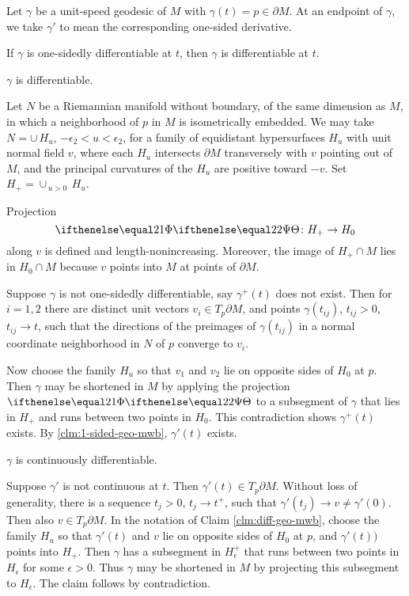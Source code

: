 Let  $\gamma$ be a unit-speed geodesic of $M$ with $\gamma(t)=p\in\partial M$.  
At an endpoint of $\gamma$, we take $\gamma'$ to mean the corresponding one-sided derivative.

\begin{clm}{}\label{clm:1-sided-geo-mwb}
If $\gamma$ is one-sidedly differentiable at $t$, then $\gamma$ is differentiable at $t$.
\end{clm}

\begin{clm}{}\label{clm:diff-geo-mwb}
$\gamma$ is differentiable.
\end{clm}
Let $N$ be a Riemannian manifold without boundary, of the same dimension as $M$, in which  a neighborhood of $p$ in $M$ is isometrically embedded. We may take  $N=\cup \,H_u$, $-\epsilon_2<u<\epsilon_2$, for a family of equidistant hypersurfaces $H_u$ with unit normal field $v$,  where each $H_u$ intersects $\partial M$ transversely with $v$ pointing out of $M$, and the 
principal curvatures of the $H_u$ are positive toward $-v$. 
Set $H_+=\cup_{\,u>0} \,H_u$.

Projection 
$$\map[2]\:H_+ \to H_0$$
 along $v$ is defined and length-nonincreasing.  Moreover, the image of $H_+\cap M$ lies in $H_0\cap M$ because $v$ points into $M$ at points of $\partial M$.

Suppose $\gamma$ is not one-sidedly differentiable, say $\gamma^+(t)$ does not exist.  Then for $i=1,2$ there are distinct unit vectors $v_i \in T_p\partial M$, and points $\gamma(t_{ij})$, $t_{ij}>0$, $t_{ij}\to t$, such that the directions of the preimages of $\gamma(t_{ij})$ in a normal coordinate neighborhood in $N$ of $p$  converge to $v_i$.

Now choose the family $H_u$ so that $v_1$ and $v_2$ lie on opposite sides of $H_0$ at $p$.  Then $\gamma$ may be shortened in $M$ by applying the projection $\map[2]$ to a subsegment of $\gamma$ that lies in $H_+$ and runs between two points in $H_0$.  This contradiction shows $\gamma^+(t)$ exists. By \ref{clm:1-sided-geo-mwb}, $\gamma'(t)$  exists.

\begin{clm}{}\label{clm:C^1-geo-mwb}
$\gamma$ is continuously differentiable. 
\end{clm}

 Suppose $\gamma'$ is not continuous at $t$. Then $\gamma'(t)\in T_p\partial M$. Without loss of generality, there is a sequence $t_j>0$, $t_j\to t^+$, such that  $\gamma'(t_j)\to v\ne \gamma'(0)$.  Then also $v\in T_p\partial M$. In the notation of Claim \ref{clm:diff-geo-mwb}, choose the family $H_u$ so that $\gamma'(t)$ and $v$ lie on opposite sides of $H_0$ at $p$, and $\gamma'(t))$ points into $H_+$.  Then $\gamma$ has a subsegment in $H_\epsilon^+$ that runs between two points in $H_\epsilon$ for some $\epsilon>0$.   
 Thus $\gamma$ may be shortened in $M$ by projecting this subsegment to $H_\epsilon$.  The claim follows by contradiction.

